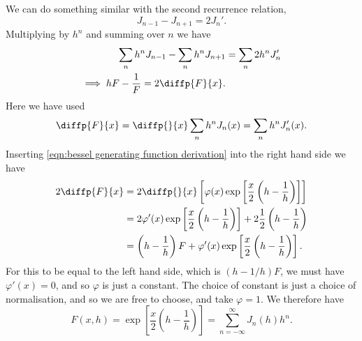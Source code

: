 \documentclass[fleqn]{NotesClass}
\begin{document}
    We can do something similar with the second recurrence relation,
    \begin{equation}
        J_{n-1} - J_{n+1} = 2J_n'.
    \end{equation}
    Multiplying by \(h^n\) and summing over \(n\) we have
    \begin{align}
        \sum_n h^nJ_{n-1} - \sum_n h^n J_{n+1} &= \sum_n 2h^nJ_n'\\
        \implies hF - \frac{1}{F} = 2\diffp{F}{x}.
    \end{align}
    Here we have used
    \begin{equation}
        \diffp{F}{x} = \diffp{}{x}\sum_{n} h^nJ_n(x) = \sum_n h^n J_n'(x).
    \end{equation}
    Inserting \cref{eqn:bessel generating function derivation} into the right hand side we have
    \begin{align}
        2\diffp{F}{x} &= 2\diffp{}{x} \left[ \varphi(x) \exp\left[ \frac{x}{2}\left( h - \frac{1}{h} \right) \right] \right]\\
        &= 2\varphi'(x) \exp\left[ \frac{x}{2}\left( h - \frac{1}{h} \right) \right] + 2 \frac{1}{2}\left( h - \frac{1}{h} \right)\\
        &= \left( h - \frac{1}{h} \right)F + \varphi'(x) \exp\left[ \frac{x}{2}\left( h - \frac{1}{h} \right) \right].
    \end{align}
    For this to be equal to the left hand side, which is \((h - 1/h)F\), we must have \(\varphi'(x) = 0\), and so \(\varphi\) is just a constant.
    The choice of constant is just a choice of normalisation, and so we are free to choose, and take \(\varphi = 1\).
    We therefore have
    \begin{equation}
        F(x, h) = \exp\left[ \frac{x}{2} \left( h - \frac{1}{h} \right) \right] = \sum_{n = - \infty}^{\infty} J_n(h) h^n.
    \end{equation}
    
\end{document}
